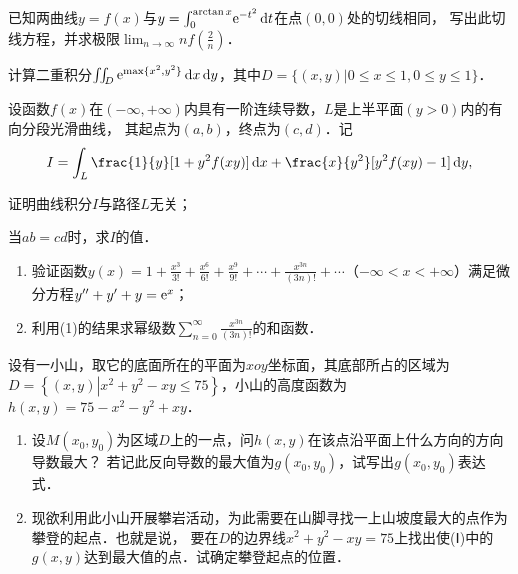 \documentclass[plain,noanswer,medmath]{../../template/jnuexam}
\begin{document}

\begin{problem}
已知两曲线$y = f(x)$与$y = \int_0^{\arctan x} \!\mathrm{e}^{- t^2} \mathop{}\!\mathrm{d} t$在点$(0,0)$处的切线相同，
写出此切线方程，并求极限$\lim_{n \to \infty} nf\left(\frac{2}{n} \right)$．
\end{problem}



\begin{problem}
计算二重积分$\iint_D \mathrm{e}^{\max \{x^2,y^2\}} \mathop{}\!\mathrm{d} x\mathop{}\!\mathrm{d} y$，其中$D = \{(x,y)|0 \le x \le 1,0 \le y \le 1\}$．
\end{problem}



\begin{problem}
设函数$f(x)$在$(-\infty , +\infty)$内具有一阶连续导数，$L$是上半平面$(y > 0)$内的有向分段光滑曲线，
其起点为$(a,b)$，终点为$(c,d)$．记
$$I = \int_L \frac{1}{y} [1 + y^2 f(xy)]\dx + \frac{x}{y^2}[y^2 f(xy) - 1]\dy,$$
\begin{enumerate*}
\item 证明曲线积分$I$与路径$L$无关；\item 当$ab = cd$时，求$I$的值．
\end{enumerate*}

\end{problem}



\begin{problem}
\begin{enumerate}
  \item 验证函数$y(x) = 1 + \frac{x^3}{3!} + \frac{x^6}{6!} + \frac{x^9}{9!}
        + \cdots + \frac{x^{3n}}{(3n)!}+ \cdots$（$-\infty < x < +\infty$）满足微分方程$y'' + y' + y = \mathrm{e}^x$；
  \item 利用(1)的结果求幂级数$\sum_{n = 0}^{\infty}\frac{x^{3n}}{(3n)!}$的和函数．
\end{enumerate}
\end{problem}



\begin{problem}
设有一小山，取它的底面所在的平面为$xoy$坐标面，其底部所占的区域为
$D = \left\{(x,y)\left| x^2 + y^2 - xy \le 75 \right. \right\}$，小山的高度函数为$h(x,y) = 75 - x^2 - y^2 + xy$．
\begin{enumerate}
\item 设$M(x_0,y_0)$为区域$D$上的一点，问$h(x,y)$在该点沿平面上什么方向的方向导数最大？
若记此反向导数的最大值为$g(x_0,y_0)$，试写出$g(x_0,y_0)$表达式．
\item 现欲利用此小山开展攀岩活动，为此需要在山脚寻找一上山坡度最大的点作为攀登的起点．也就是说，
要在$D$的边界线$x^2 + y^2 - xy = 75$上找出使(\!Ⅰ\!)中的$g(x,y)$达到最大值的点．试确定攀登起点的位置．
\end{enumerate}
\end{problem}
\end{document}
